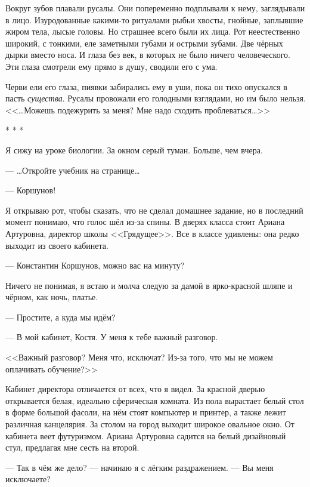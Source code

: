 \documentclass[openany, oneside]{book}
\begin{document}
Вокруг зубов плавали русалы. Они попеременно подплывали к нему, заглядывали в лицо. Изуродованные какими-то ритуалами рыбьи хвосты, гнойные, заплывшие жиром тела, лысые головы. Но страшнее всего были их лица. Рот неестественно широкий, с тонкими, еле заметными губами и острыми зубами. Две чёрных дырки вместо носа. И глаза без век, в которых не было ничего человеческого. Эти глаза смотрели ему прямо в душу, сводили его с ума.

Черви ели его глаза, пиявки забирались ему в уши, пока он тихо опускался в пасть \textit{существа}. Русалы провожали его голодными взглядами, но им было нельзя.\\

<<\dots Можешь подежурить за меня? Мне надо сходить проблеваться\dots>>

\begin{center}
    * * *
\end{center}

Я сижу на уроке биологии. За окном серый туман. Больше, чем вчера.

--- \dots Откройте учебник на странице\dots

--- Коршунов!

Я открываю рот, чтобы сказать, что не сделал домашнее задание, но в последний момент понимаю, что голос шёл из-за спины. В дверях класса стоит Ариана Артуровна, директор школы <<Грядущее>>. Все в классе удивлены: она редко выходит из своего кабинета.

--- Константин Коршунов, можно вас на минуту?

Ничего не понимая, я встаю и молча следую за дамой в ярко-красной шляпе и чёрном, как ночь, платье.

--- Простите, а куда мы идём?

--- В мой кабинет, Костя. У меня к тебе важный разговор.

<<Важный разговор? Меня что, исключат? Из-за того, что мы не можем оплачивать обучение?>>

Кабинет директора отличается от всех, что я видел. За красной дверью открывается белая, идеально сферическая комната. Из пола вырастает белый стол в форме большой фасоли, на нём стоят компьютер и принтер, а также лежит различная канцелярия. За столом на город выходит широкое овальное окно. От кабинета веет футуризмом. Ариана Артуровна садится на белый дизайновый стул, предлагая мне сесть на второй.

--- Так в чём же дело? --- начинаю я с лёгким раздражением. --- Вы меня исключаете?
\end{document}
